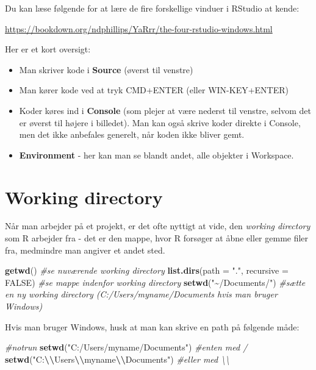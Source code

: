 \documentclass[
]{book}
\newenvironment{Shaded}{\begin{snugshade}}{\end{snugshade}}
\newcommand{\AttributeTok}[1]{\textcolor[rgb]{0.27,0.27,0.27}{#1}}
\newcommand{\CommentTok}[1]{\textcolor[rgb]{0.37,0.37,0.37}{\textit{#1}}}
\newcommand{\ConstantTok}[1]{\textcolor[rgb]{0.37,0.37,0.37}{#1}}
\newcommand{\FunctionTok}[1]{\textcolor[rgb]{0.27,0.27,0.27}{\textbf{#1}}}
\newcommand{\NormalTok}[1]{#1}
\newcommand{\SpecialCharTok}[1]{\textcolor[rgb]{0.43,0.43,0.43}{\textbf{#1}}}
\newcommand{\StringTok}[1]{\textcolor[rgb]{0.5,0.5,0.5}{#1}}
\providecommand{\tightlist}{%
  \setlength{\itemsep}{0pt}\setlength{\parskip}{0pt}}
\begin{document}
Du kan læse følgende for at lære de fire forskellige vinduer i RStudio at kende:

\url{https://bookdown.org/ndphillips/YaRrr/the-four-rstudio-windows.html}

Her er et kort oversigt:

\begin{itemize}
\tightlist
\item
  Man skriver kode i \textbf{Source} (øverst til venstre)
\item
  Man kører kode ved at tryk CMD+ENTER (eller WIN-KEY+ENTER)
\item
  Koder køres ind i \textbf{Console} (som plejer at være nederst til venstre, selvom det er øverst til højere i billedet). Man kan også skrive koder direkte i Console, men det ikke anbefales generelt, når koden ikke bliver gemt.
\item
  \textbf{Environment} - her kan man se blandt andet, alle objekter i Workspace.
\end{itemize}

\section{Working directory}\label{working-directory}

Når man arbejder på et projekt, er det ofte nyttigt at vide, den \emph{working directory} som R arbejder fra - det er den mappe, hvor R forsøger at åbne eller gemme filer fra, medmindre man angiver et andet sted.

\begin{Shaded}
\begin{Highlighting}[]
\FunctionTok{getwd}\NormalTok{() }\CommentTok{\#se nuværende working directory}
\FunctionTok{list.dirs}\NormalTok{(}\AttributeTok{path =} \StringTok{"."}\NormalTok{, }\AttributeTok{recursive =} \ConstantTok{FALSE}\NormalTok{) }\CommentTok{\#se mappe indenfor working directory}
\FunctionTok{setwd}\NormalTok{(}\StringTok{"\textasciitilde{}/Documents/"}\NormalTok{) }\CommentTok{\#sætte en ny working directory (C:/Users/myname/Documents hvis man bruger Windows)}
\end{Highlighting}
\end{Shaded}

Hvis man bruger Windows, husk at man kan skrive en path på følgende måde:

\begin{Shaded}
\begin{Highlighting}[]
\CommentTok{\#notrun}
\FunctionTok{setwd}\NormalTok{(}\StringTok{"C:/Users/myname/Documents"}\NormalTok{) }\CommentTok{\#enten med /}
\FunctionTok{setwd}\NormalTok{(}\StringTok{"C:}\SpecialCharTok{\textbackslash{}\textbackslash{}}\StringTok{Users}\SpecialCharTok{\textbackslash{}\textbackslash{}}\StringTok{myname}\SpecialCharTok{\textbackslash{}\textbackslash{}}\StringTok{Documents"}\NormalTok{) }\CommentTok{\#eller med \textbackslash{}\textbackslash{}}
\end{Highlighting}
\end{Shaded}
\end{document}
